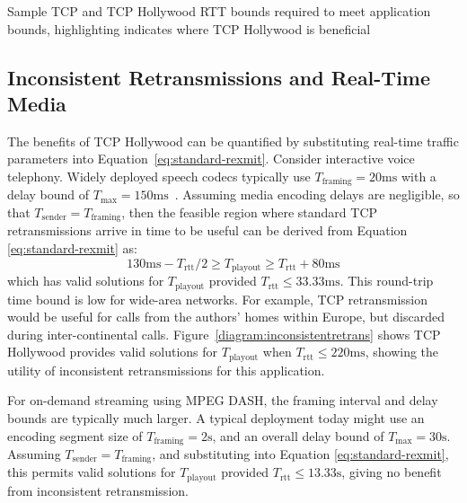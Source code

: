 \begin{table}[h]
 \centering
 \normalsize
  
 \vspace{4mm}
 \caption{Sample TCP and TCP Hollywood RTT bounds required to meet application bounds,
 highlighting indicates where TCP Hollywood is beneficial}
\label{tab:analysis_comparison}
\end{table}

\subsection{Inconsistent Retransmissions and Real-Time Media}
\label{subsec:realtime}
The benefits of TCP Hollywood can be quantified by substituting real-time
traffic parameters into Equation~\ref{eq:standard-rexmit}.
Consider interactive voice telephony. Widely deployed speech codecs typically
use $T_\mathrm{framing} = 20\mathrm{ms}$ with a delay bound of $T_\mathrm{max} =
150\mathrm{ms}$~\cite{itu:2003:delay}. Assuming media encoding delays are
negligible, so that $T_\mathrm{sender} = T_\mathrm{framing}$, then the feasible
region where standard TCP retransmissions arrive in time to be useful can be
derived from Equation \ref{eq:standard-rexmit} as:
\begin{equation}
  130\mathrm{ms} - T_\mathrm{rtt}/2
  \geq
  T_\mathrm{playout}
  \geq
  T_\mathrm{rtt} + 80\mathrm{ms}
  \label{eq:telephony-delay-bound}
\end{equation}
which has valid solutions for $T_\mathrm{playout}$ provided $T_\mathrm{rtt} \leq
33.33\mathrm{ms}$. This round-trip time bound is low for wide-area networks. For
example, TCP retransmission would be useful for calls from the authors' homes
within Europe, but discarded during inter-continental calls.
Figure~\ref{diagram:inconsistentretrans} shows TCP Hollywood
provides valid solutions for $T_\mathrm{playout}$ when $T_\mathrm{rtt} \leq
220\mathrm{ms}$, showing the utility of inconsistent retransmissions for this
application.

For on-demand streaming using MPEG DASH, the framing interval
and delay bounds are typically much larger.  A typical deployment today
might use an encoding segment size of $T_\mathrm{framing} = 2\mathrm{s}$,
and an overall delay bound of $T_\mathrm{max} = 30\mathrm{s}$. Assuming
$T_\mathrm{sender} = T_\mathrm{framing}$, and substituting into Equation
\ref{eq:standard-rexmit}, this permits valid solutions for
$T_\mathrm{playout}$ provided $T_\mathrm{rtt} \leq 13.33\mathrm{s}$,
giving no benefit from inconsistent retransmission.


